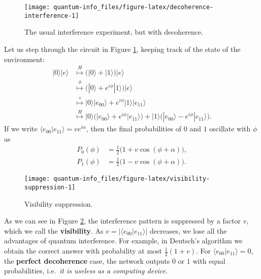 \documentclass[fleqn]{article}
\begin{document}
\begin{figure}[H]

{\centering \texttt{[image: quantum-info\_files/figure-latex/decoherence-interference-1]} 

}

\caption{The usual interference experiment, but with decoherence.}\label{fig:decoherence-interference}
\end{figure}

Let us step through the circuit in Figure \ref{fig:decoherence-interference}, keeping track of the state of the environment:
\[
  \begin{aligned}
    |0\rangle|e\rangle
    & \overset{H}{\longmapsto} \Big( |0\rangle + |1\rangle \Big) |e\rangle
  \\& \overset{\phi}{\longmapsto} \Big( |0\rangle + e^{i\phi}|1\rangle \Big) |e\rangle
  \\& \overset{\times}{\longmapsto} |0\rangle|e_{00}\rangle + e^{i\phi}|1\rangle|e_{11}\rangle
  \\& \overset{H}{\longmapsto} |0\rangle\Big( |e_{00}\rangle + e^{i\phi}|e_{11}\rangle \Big) + |1\rangle\Big( |e_{00}\rangle - e^{i\phi}|e_{11}\rangle \Big).
  \end{aligned}
\]
If we write \(\langle e_{00}|e_{11}\rangle = ve^{i\alpha}\), then the final probabilities of \(0\) and \(1\) oscillate with \(\phi\) as
\[
  \begin{aligned}
    P_{0}(\phi) &= \frac12\big(1 + v\cos(\phi + \alpha)\big),
  \\P_{1}(\phi) &= \frac12\big(1 - v\cos(\phi + \alpha)\big).
  \end{aligned}
\]

\begin{figure}[H]

{\centering \texttt{[image: quantum-info\_files/figure-latex/visibility-suppression-1]} 

}

\caption{Visibility suppression.}\label{fig:visibility-suppression}
\end{figure}

As we can see in Figure \ref{fig:visibility-suppression}, the interference pattern is suppressed by a factor \(v\), which we call the \textbf{visibility}.
As \(v=|\langle e_{00}|e_{11}\rangle|\) decreases, we lose all the advantages of quantum interference.
For example, in Deutsch's algorithm we obtain the correct answer with probability at most \(\frac12(1+v)\).
For \(\langle e_{00}|e_{11}\rangle = 0\), the \textbf{perfect decoherence} case, the network outputs \(0\) or \(1\) with equal probabilities, i.e.~\emph{it is useless as a computing device}.
\end{document}
